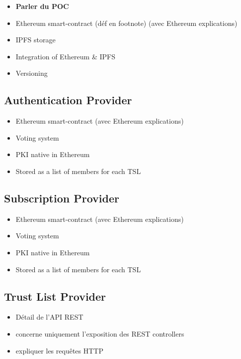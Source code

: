 \documentclass{tnreport}
\begin{document}
\begin{itemize}
	\item \textbf{Parler du POC}
	\item Ethereum smart-contract (déf en footnote) (avec Ethereum explications) %
	\item IPFS storage
	\item Integration of Ethereum \& IPFS
	\item Versioning
\end{itemize}

\subsection{Authentication Provider}

\begin{itemize}
	\item Ethereum smart-contract (avec Ethereum explications)
	\item Voting system
	\item PKI native in Ethereum
	\item Stored as a list of members for each TSL
\end{itemize}

\subsection{Subscription Provider}

\begin{itemize}
	\item Ethereum smart-contract (avec Ethereum explications)
	\item Voting system
	\item PKI native in Ethereum
	\item Stored as a list of members for each TSL
\end{itemize}

\subsection{Trust List Provider}

\begin{itemize}
	\item Détail de l'API REST
	\item concerne uniquement l'exposition des REST controllers
	\item expliquer les requêtes HTTP
\end{itemize}
\end{document}
